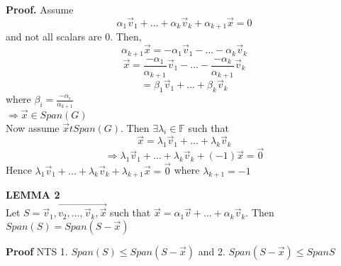 \documentclass [12pt]{article}
\begin{document}
\noindent\textbf{Proof. }Assume
\[\alpha_1\overrightarrow{v}_1+...+\alpha_k\overrightarrow{v}_k+\alpha_{k+1}\overrightarrow{x}=0\]
and not all scalars are 0. Then,
\[\alpha_{k+1}\overrightarrow{x}=-\alpha_1\overrightarrow{v}_1-...-\alpha_k\overrightarrow{v}_k\]
\[\overrightarrow{x}=\frac{-\alpha_1}{\alpha_{k+1}}\overrightarrow{v}_1-...-\frac{-\alpha_k}{\alpha_{k+1}}\overrightarrow{v}_k\]
\[=\beta_1\overrightarrow{v}_1+...+\beta_k\overrightarrow{v}_k\]
where $\beta_i=\frac{-\alpha_i}{\alpha_{k+1}}$\\
$\Rightarrow\overrightarrow{x}\in Span(G)$\\
Now assume $\overrightarrow{x}tSpan(G)$. Then $\exists\lambda_i\in\mathbb{F}$ such that 
\[\overrightarrow{x}=\lambda_1\overrightarrow{v}_1+...+\lambda_k\overrightarrow{v}_k\]
\[\Rightarrow\lambda_1\overrightarrow{v}_1+...+\lambda_k\overrightarrow{v}_k+(-1)\overrightarrow{x}=\overrightarrow{0}\]
Hence $\lambda_1\overrightarrow{v}_1+...+\lambda_k\overrightarrow{v}_k+\lambda_{k+1}\overrightarrow{x}=\overrightarrow{0}$ where $\lambda_{k+1}=-1$
\pagebreak
\begin{framed}
\noindent\textbf{LEMMA 2}\\
Let $S={\overrightarrow{v}_1,\overrightarrow{v_2,...,\overrightarrow{v}_k,\overrightarrow{x}}}$ such that $\overrightarrow{x}=\alpha_1\overrightarrow{v}+...+\alpha_k\overrightarrow{v}_k$. Then $Span(S)=Span(S-{\overrightarrow{x}})$
\end{framed}
\noindent\textbf{Proof} NTS 1. $Span(S)\leq Span(S-{\overrightarrow{x}})$ and 2. $Span(S-{\overrightarrow{x}})\leq Span S$
\end{document}
